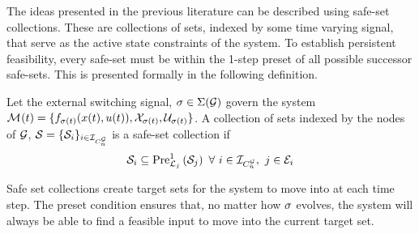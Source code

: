 The ideas presented in the previous literature can be described using safe-set collections. These are collections of sets, indexed by some time varying signal, that serve as the active state constraints of the system. To establish persistent feasibility, every safe-set must be within the 1-step preset of all possible successor safe-sets. This is presented formally in the following definition.
\begin{definition}
Let the external switching signal, $\ss\in\Sigma(\graph)$ govern the system $\mode{}(t)=\{f_{\ss(t)}(x(t),u(t)),\xcon[\ss(t)],\ucon[\ss(t)]\}$. A collection of sets indexed by the nodes of $\graph$, $\mathcal{S}=\{\mathcal{S}_{i}\}_{i\in\idxset{\gnumnodes}}$ is a safe-set collection if
$$\mathcal{S}_{i}\subseteq\Pre[\gnodelabel{j}][1]{\mathcal{S}_{j}}\ \forall\ i\in\idxset{\gnumnodes},\ j\in \gnodeedges{i}$$
\end{definition}
Safe set collections create target sets for the system to move into at each time step. The preset condition ensures that, no matter how $\ss$ evolves, the system will always be able to find a feasible input to move into the current target set.
